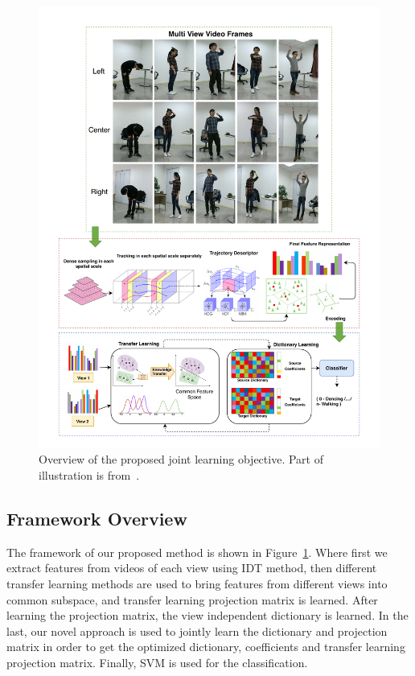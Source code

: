 \begin{figure}[]
	\centering
	\includegraphics[width=.66\textheight]{figures/framework/updatewholepage2}
	\linebreak
	\caption{Overview of the proposed joint learning objective. Part of illustration is from~\cite{HengWang:2011:ARD:2191740.2192078}.}
	\label{fig1:JDTL}
\end{figure}
\subsection{Framework Overview}
The framework of our proposed method is shown in Figure~\ref{fig1:JDTL}. Where first we extract features from videos of each view using IDT method, then different transfer learning methods are used to bring features from different views into common subspace, and transfer learning projection matrix is learned. After learning the projection matrix, the view independent dictionary is learned. In the last, our novel approach is used to jointly learn the dictionary and projection matrix in order to get the optimized dictionary, coefficients and transfer learning projection matrix. Finally, SVM is used for the classification.

